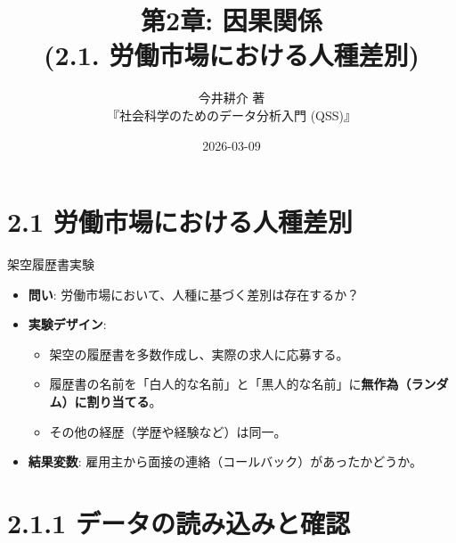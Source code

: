 \documentclass[
  ignorenonframetext,
]{beamer}
\title{第2章: 因果関係\\
(2.1. 労働市場における人種差別)}
\subtitle{今井耕介 著\\
『社会科学のためのデータ分析入門 (QSS)』}
\author{}
\date{\vspace{-2.5em}2026-03-09}
\providecommand{\tightlist}{%
  \setlength{\itemsep}{0pt}\setlength{\parskip}{0pt}}
\begin{document}
\frame{\titlepage}

\hypertarget{ux52b4ux50cdux5e02ux5834ux306bux304aux3051ux308bux4ebaux7a2eux5deeux5225}{%
\section{2.1
労働市場における人種差別}\label{ux52b4ux50cdux5e02ux5834ux306bux304aux3051ux308bux4ebaux7a2eux5deeux5225}}

\begin{frame}{架空履歴書実験}
\protect\hypertarget{ux67b6ux7a7aux5c65ux6b74ux66f8ux5b9fux9a13}{}
\begin{itemize}
\tightlist
\item
  \textbf{問い}: 労働市場において、人種に基づく差別は存在するか？
\item
  \textbf{実験デザイン}:

  \begin{itemize}
  \tightlist
  \item
    架空の履歴書を多数作成し、実際の求人に応募する。
  \item
    履歴書の名前を「白人的な名前」と「黒人的な名前」に\textbf{無作為（ランダム）に割り当てる}。
  \item
    その他の経歴（学歴や経験など）は同一。
  \end{itemize}
\item
  \textbf{結果変数}:
  雇用主から面接の連絡（コールバック）があったかどうか。
\end{itemize}
\end{frame}

\hypertarget{ux30c7ux30fcux30bfux306eux8aadux307fux8fbcux307fux3068ux78baux8a8d}{%
\section{2.1.1
データの読み込みと確認}\label{ux30c7ux30fcux30bfux306eux8aadux307fux8fbcux307fux3068ux78baux8a8d}}
\end{document}
